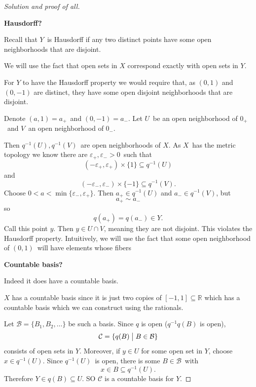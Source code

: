 \begin{proof}[Solution and proof of all]
    \medskip
    \

    \textbf{Hausdorff?}

    Recall that $Y$ is Hausdorff if 
    any two distinct points have some open neighborhoods 
    that are disjoint. 

    We will use the fact that open sets in 
    $X$ correspond exactly with open sets in $Y$.  

    For $Y$ to have the Hausdorff property
    we would require that, as 
    $(0,1)$ and $(0,-1)$ are distinct, 
    they have some open disjoint neighborhoods 
    that are disjoint. 

    Denote $(a,1) = a_+$ and $(0,-1) = a_-$. 
    Let $U$ be an open neighborhood of $0_+$ and 
    $V$ an open neighborhood of $0_-$. 

    Then $q^{-1}(U), q^{-1}(V)$ are open neighborhoods of $X$. 
    As $X$ has the metric topology we know there are 
    $\varepsilon_+, \varepsilon_- > 0$ such that 
    \[
        (-\varepsilon_+, \varepsilon_+) \times \{1\} 
        \subseteq q^{-1}(U)
    \]
    and 
    \[
        (-\varepsilon_-, \varepsilon_-) \times \{-1\} 
        \subseteq q^{-1}(V). 
    \]
    Choose $0 < a < \min\{\varepsilon_-, \varepsilon_+\}$. 
    Then $a_+ \in q^{-1}(U)$ and $a_- \in q^{-1}(V)$, but 
    \[
        a_+ \sim a_-
    \]
    so 
    \[
        q(a_+) = q(a_-) \in Y. 
    \]
    Call this point $y$. 
    Then $y \in U \cap V$, meaning they are not disjoint. 
    This violates the Hausdorff property. 
    Intuitively, we will use the fact that some open 
    neighborhood of $(0,1)$ will have elements whose fibers  
    
    \textbf{Countable basis?} 

    Indeed it does have a countable basis. 

    $X$ has a countable basis since it is just 
    two copies of $[-1,1] \subseteq \mathbb R$ which 
    has a countable basis which we can construct using 
    the rationals. 

    Let $\mathcal B = \{B_1,B_2,\ldots\}$ be such a basis. 
    Since $q$ is open ($q^{-1}q(B)$ is open), 
    \[
        \mathcal C = \{q(B) \bigm| B \in \mathcal B\}
    \]
    consists of open sets in $Y$. Moreover, if 
    $y \in U$ for some open set in $Y$, choose 
    $x \in q^{-1}(U)$. Since $q^{-1}(U)$ is open, there 
    is some $B \in \mathcal B$ with 
    \[
        x \in B \subseteq q^{-1}(U). 
    \]
    Therefore $Y \in q(B) \subseteq U$. SO 
    $\mathcal C$ is a countable basis for $Y$. 


\end{proof}
